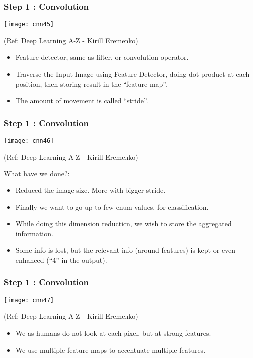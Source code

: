\begin{frame}[fragile] \frametitle{Step 1 : Convolution}

\begin{center}
\texttt{[image: cnn45]}

\tiny{(Ref: Deep Learning A-Z - Kirill Eremenko)}
\end{center}

\begin{itemize}
\item Feature detector, same as filter, or convolution operator.
\item Traverse the Input Image using Feature Detector, doing dot product at each position, then storing result in the ``feature map''.
\item The amount of movement is called ``stride''.
\end{itemize}
\end{frame}

\begin{frame}[fragile] \frametitle{Step 1 : Convolution}

\begin{center}
\texttt{[image: cnn46]}

\tiny{(Ref: Deep Learning A-Z - Kirill Eremenko)}
\end{center}

What have we done?:
\begin{itemize}
\item Reduced the image size. More with bigger stride.
\item Finally we want to go up to few enum values, for classification.
\item While doing this dimension reduction, we wish to store the aggregated information.
\item Some info is lost, but the relevant info (around features) is kept or even enhanced (``4'' in the output).
\end{itemize}

\end{frame}

\begin{frame}[fragile] \frametitle{Step 1 : Convolution}

\begin{center}
\texttt{[image: cnn47]}

\tiny{(Ref: Deep Learning A-Z - Kirill Eremenko)}
\end{center}

\begin{itemize}
\item We as humans do not look at each pixel, but at strong features.
\item We use multiple feature maps to accentuate multiple features.
\end{itemize}

\end{frame}

